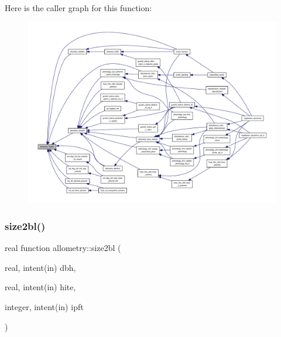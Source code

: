 Here is the caller graph for this function\+:
\nopagebreak
\begin{figure}[H]
\begin{center}
\leavevmode
\includegraphics[width=350pt]{namespaceallometry_a31aa8db06e86ec74efb5e692417399df_icgraph}
\end{center}
\end{figure}
\mbox{\label{namespaceallometry_a45ced9bf9ccd03debe8def35b579f4bd}} 
\subsubsection{\texorpdfstring{size2bl()}{size2bl()}}
{\footnotesize\ttfamily real function allometry\+::size2bl (\begin{DoxyParamCaption}\item[{real, intent(in)}]{dbh,  }\item[{real, intent(in)}]{hite,  }\item[{integer, intent(in)}]{ipft }\end{DoxyParamCaption})}

